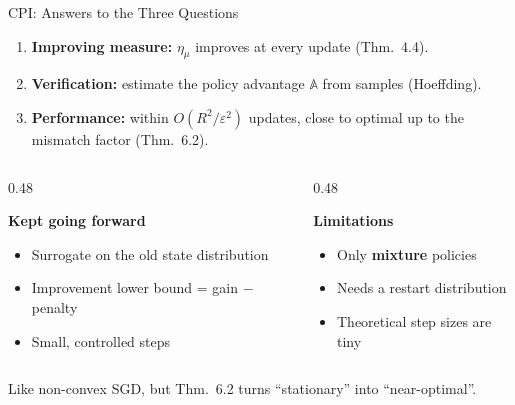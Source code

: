 \documentclass[aspectratio=169]{beamer}
\newcommand{\PA}{\mathbb{A}}              %
\begin{document}
\begin{frame}[label=cpi-summary]{CPI: Answers to the Three Questions}
  \begin{enumerate}
    \item \textbf{Improving measure:} $\eta_\mu$ improves at every update (Thm.~4.4).
    \item \textbf{Verification:} estimate the policy advantage $\PA$ from samples (Hoeffding).
    \item \textbf{Performance:} within $O(R^2/\varepsilon^2)$ updates, close to optimal up to the mismatch factor (Thm.~6.2).
  \end{enumerate}

  \vspace{8pt}
  \begin{columns}[t]
    \begin{column}{0.48\textwidth}
      \begin{goodbox}
        \small\textbf{Kept going forward}
        \begin{itemize}
          \item Surrogate on the old state distribution
          \item Improvement lower bound = gain $-$ penalty
          \item Small, controlled steps
        \end{itemize}
      \end{goodbox}
    \end{column}
    \begin{column}{0.48\textwidth}
      \begin{badbox}
        \small\textbf{Limitations}
        \begin{itemize}
          \item Only \textbf{mixture} policies
          \item Needs a restart distribution
          \item Theoretical step sizes are tiny
        \end{itemize}
      \end{badbox}
    \end{column}
  \end{columns}

  \vspace{6pt}
  {\small Like non-convex SGD, but Thm.~6.2 turns ``stationary'' into ``near-optimal''.} \hfill \hyperlink{cpi-sgd}{}
\end{frame}
\end{document}
